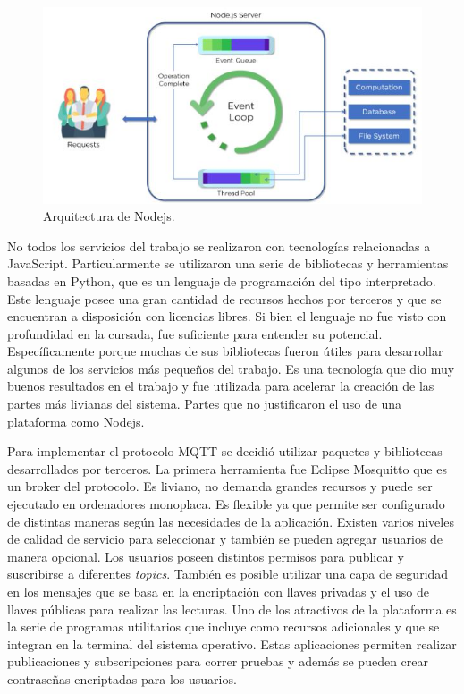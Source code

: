 \begin{figure}[h]
	\centering
	\includegraphics[width=\textwidth]{./Figures/ch2Nodejs.jpeg}
	\caption{Arquitectura de Nodejs. \citep{WEBSITE:nodejs}}
	\label{fig:ch2Nodejs}
\end{figure}

No todos los servicios del trabajo se realizaron con tecnologías relacionadas a JavaScript.
Particularmente se utilizaron una serie de bibliotecas y herramientas basadas en Python, que es un lenguaje de programación del tipo interpretado.
Este lenguaje posee una gran cantidad de recursos hechos por terceros y que se encuentran a disposición con licencias libres.
Si bien el lenguaje no fue visto con profundidad en la cursada, fue suficiente para entender su potencial.
Específicamente porque muchas de sus bibliotecas fueron útiles para desarrollar algunos de los servicios más pequeños del trabajo.
Es una tecnología que dio muy buenos resultados en el trabajo y fue utilizada para acelerar la creación de las partes más livianas del sistema.
Partes que no justificaron el uso de una plataforma como Nodejs.

Para implementar el protocolo MQTT se decidió utilizar paquetes y bibliotecas desarrollados por terceros.
La primera herramienta fue Eclipse Mosquitto que es un broker del protocolo.
Es liviano, no demanda grandes recursos y puede ser ejecutado en ordenadores monoplaca.
Es flexible ya que permite ser configurado de distintas maneras según las necesidades de la aplicación.
Existen varios niveles de calidad de servicio para seleccionar y también se pueden agregar usuarios de manera opcional.
Los usuarios poseen distintos permisos para publicar y suscribirse a diferentes \emph{topics}.
También es posible utilizar una capa de seguridad en los mensajes que se basa en la encriptación con llaves privadas y el uso de llaves públicas para realizar las lecturas.
Uno de los atractivos de la plataforma es la serie de programas utilitarios que incluye como recursos adicionales y que se integran en la terminal del sistema operativo.
Estas aplicaciones permiten realizar publicaciones y subscripciones para correr pruebas y además se pueden crear contraseñas encriptadas para los usuarios.

